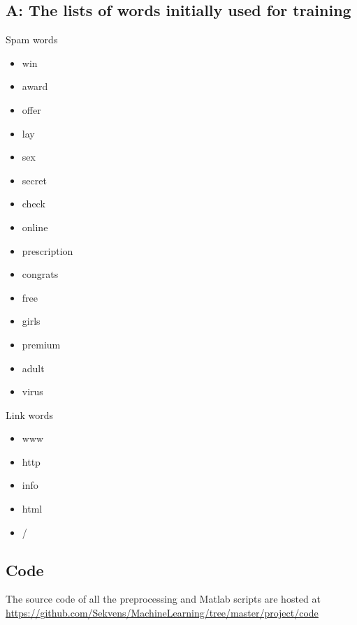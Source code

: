 \documentclass[a4paper,11pt]{article}
\theoremstyle{definition}
\begin{document}
  \subsection{A: The lists of words initially used for training}
  Spam words
  \begin{itemize}
    \item win
    \item award
    \item offer
    \item lay
    \item sex
    \item secret
    \item check
    \item online
    \item prescription
    \item congrats
    \item free
    \item girls
    \item premium
    \item adult
    \item virus
  \end{itemize}
  Link words
  \begin{itemize}
    \item www
    \item http
    \item info
    \item html
    \item /
  \end{itemize}
  \subsection{Code}
    The source code of all the preprocessing and Matlab scripts are hosted at
    \url{https://github.com/Sekvens/MachineLearning/tree/master/project/code}




\end{document}
